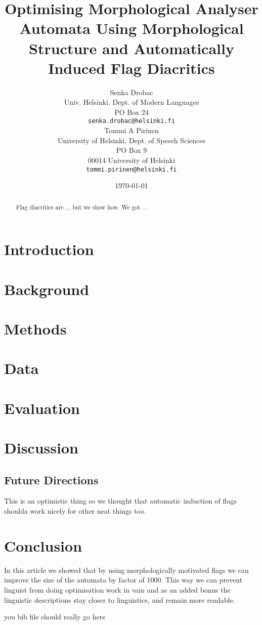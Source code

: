 \documentclass[11pt]{article}
\title{Optimising Morphological Analyser Automata Using Morphological Structure
and Automatically Induced Flag Diacritics}
\author{Senka Drobac \\
Univ. Helsinki, Dept. of Modern Languages \\
PO Box 24 \\
  {\tt senka.drobac@helsinki.fi} \\\And
  Tommi A Pirinen \\
University of Helsinki, Dept. of Speech Sciences\\
PO Box 9\\
00014 University of Helsinki\\
  {\tt tommi.pirinen@helsinki.fi} \\}
\date{\today}
\begin{document}
\maketitle
\begin{abstract}
    Flag diacritics are ... but we show how. We got ... 
\end{abstract}

\section{Introduction}

\section{Background}

\section{Methods}

\section{Data}

\section{Evaluation}

\section{Discussion}

\subsection{Future Directions}

This is an optimistic thing so we thought that automatic induction of flags
shoulda work nicely for other neat things too.

\section{Conclusion}

In this article we showed that by using morphologically motivated flags we can
improve the size of the automata by factor of 1000. This way we can prevent
linguist from doing optimisation work in vain and as an added bonus the
linguistic descriptions stay closer to linguistics, and remain more readable.

\iffalse
\section*{Acknowledgments}

We thank and got funding.
\fi


 you bib file should really go here 

\end{document}
